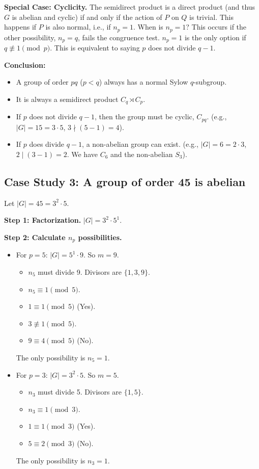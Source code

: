 \documentclass[12pt,a4paper]{article}
\theoremstyle{plain} %
\theoremstyle{definition} %
\theoremstyle{remark} %
\begin{document}
\textbf{Special Case: Cyclicity.}
The semidirect product is a direct product (and thus $G$ is abelian and cyclic) if and only if the action of $P$ on $Q$ is trivial. This happens if $P$ is also normal, i.e., if $n_p=1$.
When is $n_p=1$? This occurs if the other possibility, $n_p=q$, fails the congruence test.
$n_p=1$ is the only option if $q \not\equiv 1 \pmod{p}$. This is equivalent to saying $p$ does not divide $q-1$.

\textbf{Conclusion:}
\begin{itemize}
    \item A group of order $pq$ ($p<q$) always has a normal Sylow $q$-subgroup.
    \item It is always a semidirect product $C_q \rtimes C_p$.
    \item If $p$ does not divide $q-1$, then the group must be cyclic, $C_{pq}$. (e.g., $|G|=15=3 \cdot 5$, $3 \nmid (5-1)=4$).
    \item If $p$ does divide $q-1$, a non-abelian group can exist. (e.g., $|G|=6=2 \cdot 3$, $2 \mid (3-1)=2$. We have $C_6$ and the non-abelian $S_3$).
\end{itemize}

\subsection{Case Study 3: A group of order 45 is abelian}
Let $|G|=45 = 3^2 \cdot 5$.

\textbf{Step 1: Factorization.} $|G|=3^2 \cdot 5^1$.

\textbf{Step 2: Calculate $n_p$ possibilities.}
\begin{itemize}
    \item For $p=5$: $|G|=5^1 \cdot 9$. So $m=9$.
        \begin{itemize}
            \item $n_5$ must divide 9. Divisors are $\{1, 3, 9\}$.
            \item $n_5 \equiv 1 \pmod{5}$.
                \item $1 \equiv 1 \pmod{5}$ (Yes).
                \item $3 \not\equiv 1 \pmod{5}$.
                \item $9 \equiv 4 \pmod{5}$ (No).
        \end{itemize}
        The only possibility is $n_5=1$.

    \item For $p=3$: $|G|=3^2 \cdot 5$. So $m=5$.
        \begin{itemize}
            \item $n_3$ must divide 5. Divisors are $\{1, 5\}$.
            \item $n_3 \equiv 1 \pmod{3}$.
                \item $1 \equiv 1 \pmod{3}$ (Yes).
                \item $5 \equiv 2 \pmod{3}$ (No).
        \end{itemize}
        The only possibility is $n_3=1$.
\end{itemize}
\end{document}
